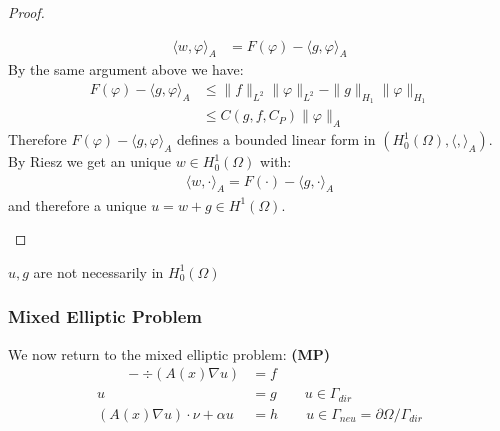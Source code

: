 \begin{proof}
\begin{enumerate}
\begin{align*}
		\langle w, \varphi \rangle_A &= F(\varphi) - \langle g , \varphi \rangle_A
	\end{align*}
	By the same argument above we have:
	\begin{align*}
		F(\varphi) - \langle g,  \varphi \rangle_A 
		&\leq \|f\|_{L^2} \|\varphi\|_{L^2} - \|g\|_{H_1} \|\varphi\|_{H_1} \\
		&\leq C(g, f, C_P)  \|\varphi\|_A
	\end{align*}
	Therefore $F(\varphi) - \langle g,  \varphi \rangle_A$ defines a bounded linear form in $(H^1_0(\Omega), \langle,\rangle_A)$. By Riesz we get an unique $w \in H^1_0(\Omega)$ with:
	\begin{align*}
		\langle w, \cdot \rangle_A = F(\cdot) - \langle g,  \cdot \rangle_A
	\end{align*} and therefore a unique $u = w + g \in H^1(\Omega) $.
\end{enumerate}
\end{proof}
\begin{remark}
$u, g$ are not necessarily in $H^1_0(\Omega)$	
\end{remark}







\subsubsection{Mixed Elliptic Problem}
We now return to the mixed elliptic problem: \textbf{(MP)}
\begin{equation}
\begin{aligned} \qquad
	-\div(A(x) \nabla u) &= f\\
	u &= g \qquad u \in \Gamma_{dir}\\
	(A(x)\nabla u)\cdot \nu + \alpha u &= h \qquad  u \in \Gamma_{neu} = \partial \Omega \slash \Gamma_{dir} 
\end{aligned}
\end{equation}

